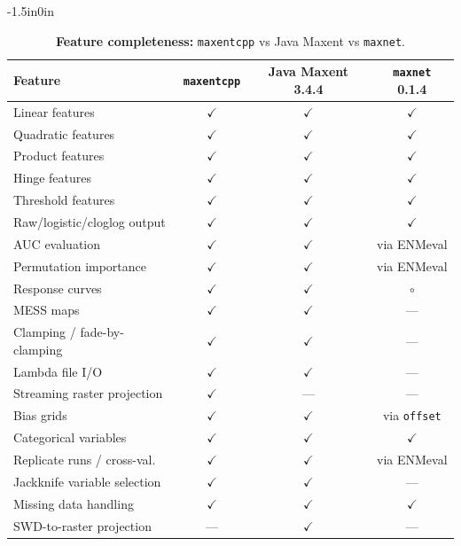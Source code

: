 \documentclass[10pt,letterpaper]{article}
\begin{document}
\begin{table}[!ht]
\begin{adjustwidth}{-1.5in}{0in}
\centering
\caption{{\bf Feature completeness:} \texttt{maxentcpp} vs Java Maxent
         vs \texttt{maxnet}.}
\begin{tabular}{|l|c|c|c|}
\hline
\textbf{Feature} & \textbf{\texttt{maxentcpp}} & \textbf{Java Maxent 3.4.4} & \textbf{\texttt{maxnet} 0.1.4} \\
\hline
Linear features              & $\checkmark$ & $\checkmark$ & $\checkmark$ \\
\hline
Quadratic features           & $\checkmark$ & $\checkmark$ & $\checkmark$ \\
\hline
Product features             & $\checkmark$ & $\checkmark$ & $\checkmark$ \\
\hline
Hinge features               & $\checkmark$ & $\checkmark$ & $\checkmark$ \\
\hline
Threshold features           & $\checkmark$ & $\checkmark$ & $\checkmark$ \\
\hline
Raw/logistic/cloglog output  & $\checkmark$ & $\checkmark$ & $\checkmark$ \\
\hline
AUC evaluation               & $\checkmark$ & $\checkmark$ & via ENMeval \\
\hline
Permutation importance       & $\checkmark$ & $\checkmark$ & via ENMeval \\
\hline
Response curves              & $\checkmark$ & $\checkmark$ & $\circ$ \\
\hline
MESS maps                    & $\checkmark$ & $\checkmark$ & --- \\
\hline
Clamping / fade-by-clamping  & $\checkmark$ & $\checkmark$ & --- \\
\hline
Lambda file I/O              & $\checkmark$ & $\checkmark$ & --- \\
\hline
Streaming raster projection  & $\checkmark$ & --- & --- \\
\hline
Bias grids                   & $\checkmark$ & $\checkmark$ & via \texttt{offset} \\
\hline
Categorical variables        & $\checkmark$ & $\checkmark$ & $\checkmark$ \\
\hline
Replicate runs / cross-val.  & $\checkmark$ & $\checkmark$ & via ENMeval \\
\hline
Jackknife variable selection & $\checkmark$ & $\checkmark$ & --- \\
\hline
Missing data handling        & $\checkmark$ & $\checkmark$ & $\checkmark$ \\
\hline
SWD-to-raster projection     & --- & $\checkmark$ & --- \\
\hline
\end{tabular}
\label{tab:features}
\end{adjustwidth}
\end{table}
\end{document}
